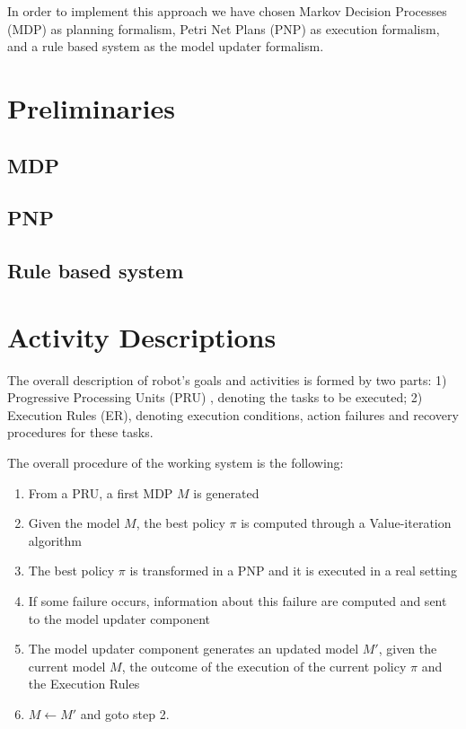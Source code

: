In order to implement this approach we have chosen Markov Decision Processes (MDP) as planning formalism, Petri Net Plans (PNP) as execution formalism, and a rule based system as the model updater formalism.

\section{Preliminaries}

\subsection{MDP}

\subsection{PNP}

\subsection{Rule based system}

\section{Activity Descriptions}

The overall description of robot's goals and activities is formed by two parts:
1) Progressive Processing Units (PRU) \cite{CaMoZi01}, denoting the tasks to be executed;
2) Execution Rules (ER), denoting execution conditions, action failures and recovery procedures for these tasks.

The overall procedure of the working system is the following:
\begin{enumerate}
\item From a PRU, a first MDP $M$ is generated 
\item Given the model $M$, the best policy $\pi$ is computed through a Value-iteration algorithm
\item The best policy $\pi$ is transformed in a PNP and it is executed in a real setting
\item If some failure occurs, information about this failure are computed and sent to the model updater component
\item The model updater component generates an updated model $M'$, given the current model $M$, the outcome of the execution of the current policy $\pi$ and the Execution Rules
\item $M \leftarrow M'$ and goto step 2. 
\end{enumerate}



